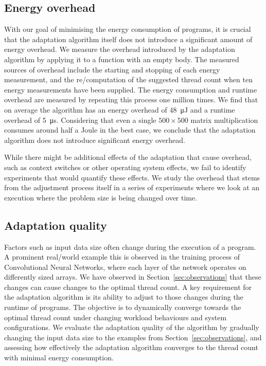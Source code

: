 \subsection{Energy overhead}
With our goal of minimising the energy consumption of programs, it is crucial that the adaptation algorithm itself does not introduce a significant amount of energy overhead.
We measure the overhead introduced by the adaptation algorithm by applying it to a function with an empty body.
The measured sources of overhead include the starting and stopping of each energy measurement, and the re\-/computation of the suggested thread count when ten energy measurements have been supplied.
The energy consumption and runtime overhead are measured by repeating this process one million times.
We find that on average the algorithm has an energy overhead of \qty{48}{\micro\joule} and a runtime overhead of \qty{5}{\micro\second}.
Considering that even a single $500 \times 500$ matrix multiplication consumes around half a Joule in the best case, we conclude that the adaptation algorithm does not introduce significant energy overhead.

While there might be additional effects of the adaptation that cause overhead, such as context switches or other operating system effects, we fail to identify experiments that would quantify these effects.
We study the overhead that stems from the adjustment process itself in a series of experiments where we look at an execution where the problem size is being changed over time.

\subsection{Adaptation quality}\label{sec:evaluation-adaptation}
Factors such as input data size often change during the execution of a program.
A prominent real\-/world example this is observed in the training process of Convolutional Neural Networks, where each layer of the network operates on differently sized arrays.
We have observed in Section~\ref{sec:observations} that these changes can cause changes to the optimal thread count.
A key requirement for the adaptation algorithm is its ability to adjust to those changes during the runtime of programs.
The objective is to dynamically converge towards the optimal thread count under changing workload behaviours and system configurations.
We evaluate the adaptation quality of the algorithm by gradually changing the input data size to the examples from Section~\ref{sec:observations}, and assessing how effectively the adaptation algorithm converges to the thread count with minimal energy consumption.

